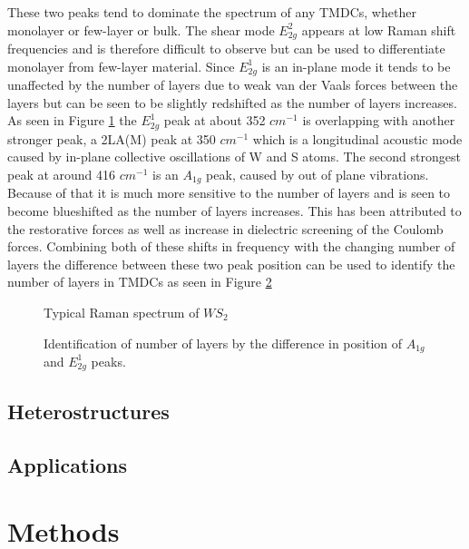 \documentclass[12pt]{article}
\begin{document}
	These two peaks tend to dominate the spectrum of any TMDCs, whether monolayer or few-layer or bulk. The shear mode $E^2_{2g}$ appears at low Raman shift frequencies and is therefore difficult to observe but can be used to differentiate monolayer from few-layer material. Since $E^1_{2g}$ is an in-plane mode it tends to be unaffected by the number of layers due to weak van der Vaals forces between the layers but can be seen to be slightly redshifted as the number of layers increases. As seen in Figure \ref{fig:TypicalRamanSpectrumWS2} the $E^1_{2g}$ peak at about 352 $cm^{-1}$ is overlapping with another stronger peak, a 2LA(M) peak at 350 $cm^{-1}$ which is a longitudinal acoustic mode caused by in-plane collective oscillations of W and S atoms. The second strongest peak at around 416 $cm^{-1}$ is an $A_{1g}$ peak, caused by out of plane vibrations. Because of that it is much more sensitive to the number of layers and is seen to become blueshifted as the number of layers increases. This has been attributed to the restorative forces as well as increase in dielectric screening of the Coulomb forces. Combining both of these shifts in frequency with the changing number of layers the difference between these two peak position can be used to identify the number of layers in TMDCs as seen in Figure \ref{fig:LayerNumberIdentificationRamanShiftWS2}
	
	\begin{figure}[h]
	\begin{center}
	\caption{Typical Raman spectrum of $WS_2$}
	\label{fig:TypicalRamanSpectrumWS2}
	\end{center}
	\end{figure}
	
	\begin{figure}
	\begin{center}
	\caption{Identification of number of layers by the difference in position of $A_{1g}$ and $E^1_{2g}$ peaks.}
	\label{fig:LayerNumberIdentificationRamanShiftWS2}
	\end{center}
	\end{figure}
	
	\subsection{Heterostructures}
	\subsection{Applications}
\section{Methods}
\end{document}
